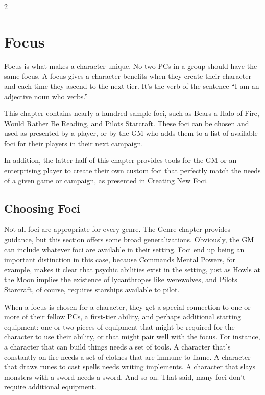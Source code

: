 \begin{multicols}{2}

\chapter{Focus}

Focus is what makes a character unique. No two PCs in a group should have the same focus. A focus gives a character benefits when they create their character and each time they ascend to the next tier. It’s the verb of the sentence “I am an adjective noun who verbs.”

This chapter contains nearly a hundred sample foci, such as Bears a Halo of Fire, Would Rather Be Reading, and Pilots Starcraft. These foci can be chosen and used as presented by a player, or by the GM who adds them to a list of available foci for their players in their next campaign.

In addition, the latter half of this chapter provides tools for the GM or an enterprising player to create their own custom foci that perfectly match the needs of a given game or campaign, as presented in Creating New Foci.

\section{Choosing Foci}

Not all foci are appropriate for every genre. The Genre chapter provides guidance, but this section offers some broad generalizations. Obviously, the GM can include whatever foci are available in their setting. Foci end up being an important distinction in this case, because Commands Mental Powers, for example, makes it clear that psychic abilities exist in the setting, just as Howls at the Moon implies the existence of lycanthropes like werewolves, and Pilots Starcraft, of course, requires starships available to pilot.

When a focus is chosen for a character, they get a special connection to one or more of their fellow PCs, a first-tier ability, and perhaps additional starting equipment: one or two pieces of equipment that might be required for the character to use their ability, or that might pair well with the focus. For instance, a character that can build things needs a set of tools. A character that’s constantly on fire needs a set of clothes that are immune to flame. A character that draws runes to cast spells needs writing implements. A character that slays monsters with a sword needs a sword. And so on. That said, many foci don’t require additional equipment.


\end{multicols}
